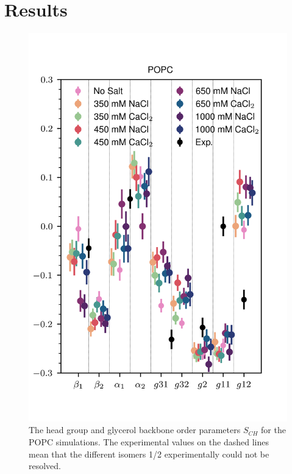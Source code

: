 \documentclass[journal=jacsat,manuscript=article,layout=singlecolumn]{achemso}
\begin{document}
\section{Results}

\begin{figure}[!hbt]
	\centering
	\includegraphics{popc_order_parameters_for_all.png}
	\caption{The head group and glycerol backbone order parameters $S_{CH}$ for the POPC simulations. The experimental values on the dashed lines mean that the different isomers 1/2 experimentally could not be resolved.}
	\label{fig:popc_order}
\end{figure}
\end{document}
